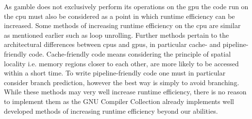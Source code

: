As \gls{gamble} does not exclusively perform its operations on the \acrshort{gpu} the code run on the \acrshort{cpu} must also be considered as a point in which runtime efficiency can be increased.
Some methods of increasing runtime efficiency on the \acrshort{cpu} are similar as mentioned earlier such as loop unrolling.
Further methods pertain to the architectural differences between \acrshort{cpu}s and \acrshort{gpu}s, in particular cache- and pipeline-friendly code.
Cache-friendly code means considering the principle of spatial locality i.e. memory regions closer to each other, are more likely to be accessed within a short time.
To write pipeline-friendly code one must in particular consider branch prediction, however the best way is simply to avoid branching.\citep{CCodeOpt}
While these methods may very well increase runtime efficiency, there is no reason to implement them as the GNU Compiler Collection already implements well developed methods of increasing runtime efficiency beyond our abilities.